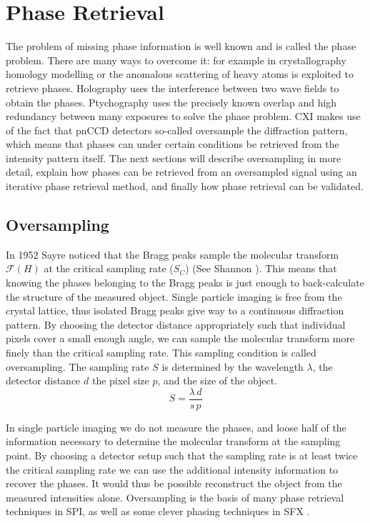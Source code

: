 \chapter{Phase Retrieval}
The problem of missing phase information is well known and is called the phase problem. There are many ways to overcome it: for example in crystallography homology modelling or the anomalous scattering of heavy atoms is exploited to retrieve phases. Holography uses the interference between two wave fields to obtain the phases. Ptychography uses the precisely known overlap and high redundancy between many exposures to solve the phase problem. CXI makes use of the fact that pnCCD detectors so-called oversample the diffraction pattern, which means that phases can under certain conditions be retrieved from the intensity pattern itself. The next sections will describe oversampling in more detail, explain how phases can be retrieved from an oversampled signal using an iterative phase retrieval method, and finally how phase retrieval can be validated. 

\section{Oversampling} 
In 1952 Sayre noticed that the Bragg peaks sample the molecular transform $\mathcal{F}(H)$ at the critical sampling rate ($S_C$)\cite{Sayre1952a} (See Shannon \cite{Shannon1949a}). This means that knowing the phases belonging to the Bragg peaks is just enough to back-calculate the structure of the measured object. Single particle imaging is free from the crystal lattice, thus isolated Bragg peaks give way to a continuous diffraction pattern. By choosing the detector distance appropriately such that individual pixels cover a small enough angle, we can sample the molecular transform more finely than the critical sampling rate. This sampling condition is called oversampling. The sampling rate $S$ is determined by the wavelength $\lambda$, the detector distance $d$ the pixel size $p$, and the size of the object. 
\begin{equation}
S = \frac{\lambda\,d}{s\,p}
\end{equation}

In single particle imaging we do not measure the phases, and loose half of the information necessary to determine the molecular transform at the sampling point. By choosing a detector setup such that the sampling rate is at least twice the critical sampling rate we can use the additional intensity information to recover the phases. It would thus be possible reconstruct the object from the measured intensities alone. Oversampling is the basis of many phase retrieval techniques in SPI, as well as some clever phasing techniques in SFX \cite{Ayyer2016,Chapman2011}.

